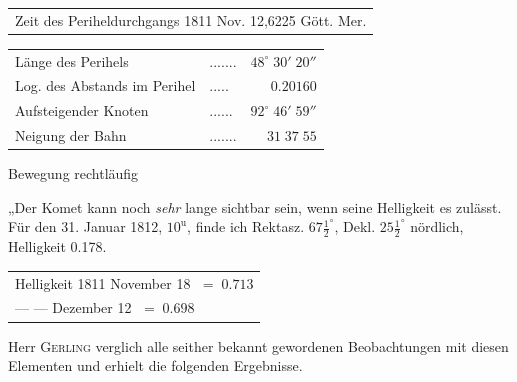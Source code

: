 \begin{center}\fontsize{10}{12}\selectfont\setlength{\tabcolsep}{4pt}\renewcommand{\arraystretch}{1.15}\begin{tabular}{l}
Zeit des Periheldurchgangs 1811 Nov. 12,6225 Gött. Mer.\\
\end{tabular}\end{center}
\begin{center}\fontsize{10}{12}\selectfont\setlength{\tabcolsep}{3pt}\renewcommand{\arraystretch}{1.15}\begin{tabular}{llr}
Länge des Perihels & .\;.\;.\;.\;.\;.\;. & $48^\circ\;30'\;20''$\\
Log. des Abstands im Perihel & .\;.\;.\;.\;. & $0.20160$\\
Aufsteigender Knoten & .\;.\;.\;.\;.\;. & $92^\circ\;46'\;59''$\\
Neigung der Bahn & .\;.\;.\;.\;.\;.\;. & $31\;37\;55$\\
\end{tabular}\end{center}
\noindent Bewegung rechtläufig


\par\indent „Der Komet kann noch \emph{sehr} lange sichtbar sein, wenn seine Helligkeit es zulässt. Für den 31. Januar 1812, $10^{\mathrm u}$, finde ich Rektasz. $67\frac{1}{2}^\circ$, Dekl. $25\frac{1}{2}^\circ$ nördlich, Helligkeit 0.178.

\begin{center}
\begin{tabular}{l}
Helligkeit 1811 November 18 $\;=\;0.713$ \\
\qquad --- \qquad --- Dezember 12 $\;=\;0.698$ \\
\end{tabular}
\end{center}


\par\indent Herr \textsc{Gerling} verglich alle seither bekannt gewordenen Beobachtungen mit diesen Elementen und erhielt die folgenden Ergebnisse.

